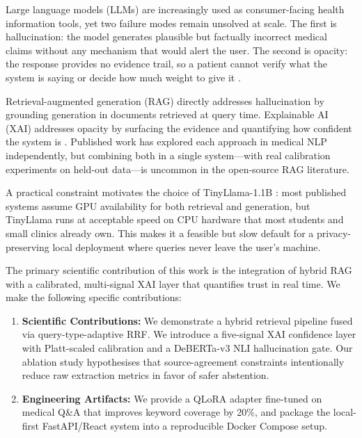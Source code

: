 \documentclass[conference,a4paper]{IEEEtran}
\begin{document}
Large language models (LLMs) are increasingly used as consumer-facing
health information tools, yet two failure modes remain unsolved at scale.
The first is hallucination: the model generates plausible but factually
incorrect medical claims without any mechanism that would alert the user.
The second is opacity: the response provides no evidence trail, so a
patient cannot verify what the system is saying or decide how much weight
to give it \cite{singhal2023large,thirunavukarasu2023}.

Retrieval-augmented generation (RAG) \cite{lewis2020rag} directly
addresses hallucination by grounding generation in documents retrieved
at query time.
Explainable AI (XAI) addresses opacity by surfacing the evidence and
quantifying how confident the system is \cite{amann2020xai}.
Published work has explored each approach in medical NLP independently,
but combining both in a single system---with real calibration experiments
on held-out data---is uncommon in the open-source RAG literature.

A practical constraint motivates the choice of TinyLlama-1.1B
\cite{zhang2024tinyllama}: most published systems assume GPU
availability for both retrieval and generation, but TinyLlama runs at
acceptable speed on CPU hardware that most students and small clinics
already own.
This makes it a feasible but slow default for a privacy-preserving local
deployment where queries never leave the user's machine.

The primary scientific contribution of this work is the integration of
hybrid RAG with a calibrated, multi-signal XAI layer that quantifies
trust in real time. We make the following specific contributions:

\begin{enumerate}[noitemsep,topsep=2pt]
  \item \textbf{Scientific Contributions:} We demonstrate a hybrid retrieval
        pipeline fused via query-type-adaptive RRF. We introduce a five-signal
        XAI confidence layer with Platt-scaled calibration and a DeBERTa-v3
        NLI hallucination gate. Our ablation study hypothesises that
        source-agreement constraints intentionally reduce raw extraction
        metrics in favor of safer abstention.
  \item \textbf{Engineering Artifacts:} We provide a QLoRA adapter
        fine-tuned on medical Q\&A that improves keyword coverage by 20\%,
        and package the local-first FastAPI/React system into a reproducible
        Docker Compose setup.
\end{enumerate}
\end{document}
